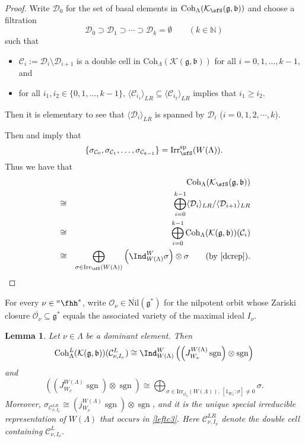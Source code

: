\documentclass[12pt,a4paper]{amsart}
\def\subset{\subseteq}
\newcommand{\BN}{{\mathbb {N}}}
\newcommand{\CC}{{\mathcal {C}}}
\newcommand{\CK}{{\mathcal {K}}}
\newcommand{\CO}{{\mathcal {O}}}
\newcommand{\sgn}{\operatorname{sgn}}
\newcommand{\g}{\mathfrak g}
\renewcommand{\b}{\mathfrak b}
\newcommand{\la}{\langle}
\newcommand{\ra}{\rangle}
\newcommand{\be}{\begin {equation}}
\newcommand{\ee}{\end {equation}}
\numberwithin{equation}{section}
\newtheorem{lem}[thm]{Lemma}
\theoremstyle{remark}
\def\Irr{\mathrm{Irr}}
\def\hha{{}^a\fhh}
\def\Coh{\mathrm{Coh}}
\begin{document}
\begin{proof}
Write $\mathcal D_0$ for the set of basal elements in $ \Coh_{\Lambda}(\CK_\sfS(\g,\b))$ and
 choose a filtration
\[
  \mathcal D_0\supset \mathcal D_1\supset \cdots \supset \mathcal D_k=\emptyset \qquad (k\in \BN)
\]
such that
\begin{itemize}
\item
$\mathcal C_i:=\mathcal D_i\setminus \mathcal D_{i+1}$ is a double cell in $\Coh_{\Lambda}(\CK(\g,\b))$ for all $i=0,1, \dots, k-1$, and
\item
for all $i_1, i_2\in \{0,1, \dots, k-1\}$,   $\la \CC_{i_1}\ra_{LR} \subset \la \CC_{i_2}\ra_{LR}$ implies that $i_1\geq i_2$.
\end{itemize}
Then it is elementary to see that  $\la \mathcal D_i\ra_{LR}$ is spanned by $\mathcal D_i$ ($i=0, 1,2, \cdots ,k$).

Then  and   imply that
\[
\{\sigma_{\CC_0}, \sigma_{\CC_1}, \dots, \sigma_{\CC_{k-1}}\}= \Irr_\sfS^{\mathrm{sp}}(W(\Lambda)).
\]
Thus we have that
\begin{eqnarray*}
   &&\Coh_{\Lambda}(\CK_\sfS(\g,\b))
\\
   &\cong & \bigoplus_{i=0}^{k-1}  \la \mathcal D_i\ra_{LR}/\la \mathcal D_{i+1}\ra_{LR}\\
    &\cong & \bigoplus_{i=0}^{k-1}  \Coh_{\Lambda}(\CK(\g,\b))(\mathcal C_i)\\
    &\cong &\bigoplus_{\sigma\in \Irr_\sfS(W(\Lambda))} \left(\Ind_{W(\Lambda)}^W\sigma\right)\otimes \sigma\qquad(\textrm{by \Cref{dcrep}}).
\end{eqnarray*}

\end{proof}

 For every $\nu\in \hha^*$, write $\CO_\nu\in \overline{\mathrm{Nil}}(\g^*)$ for the nilpotent orbit whose Zariski closure $\overline{\CO_{\nu}}\subset \g^*$ equals the associated variety of the maximal ideal $I_\nu$.


\begin{lem}\label{leftcnu}
Let $\nu\in \Lambda$ be a dominant element.   Then
\[
  \Coh^L_{\Lambda}( \CK(\g,\b))(\CC^L_{ \nu, I_\nu})\cong \Ind_{W(\Lambda)}^W \left(\left(J_{W_{\nu}}^{W(\Lambda)} \sgn \right)\otimes \sgn\right)
  \]
and
\be\label{leftc3}
  \left(\left(J_{W_{\nu}}^{W(\Lambda)} \sgn \right)\otimes \sgn\right) \cong \bigoplus_{\sigma\in \Irr_{\overline{\CO_{\nu}}}(W(\Lambda)), \, [1_{W_\nu} :\sigma]\neq 0 }  \sigma.
\ee
 Moreover,  $\sigma_{\CC^{LR}_{ \nu, I_\nu}}\cong \left(j_{W_{\nu}}^{W(\Lambda)} \sgn \right)\otimes \sgn$, and it is  the unique special irreducible representation of $W(\Lambda)$ that  occurs in \eqref{leftc3}.
Here $ \CC^{LR}_{ \nu, I_\nu}$ denote the double cell containing $\CC^{L}_{ \nu, I_\nu}$.

\end{lem}
\end{document}
